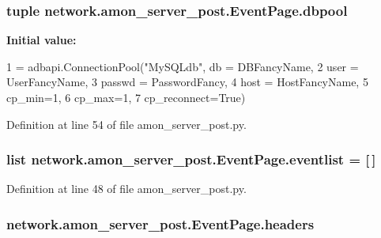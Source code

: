 \hypertarget{classnetwork_1_1amon__server__post_1_1_event_page_a27945808b5c4a8cdcde134a10df4965d}{
\subsubsection[{dbpool}]{\setlength{\rightskip}{0pt plus 5cm}tuple network.\-amon\-\_\-server\-\_\-post.\-Event\-Page.\-dbpool\hspace{0.3cm}{\ttfamily [static]}}}\label{classnetwork_1_1amon__server__post_1_1_event_page_a27945808b5c4a8cdcde134a10df4965d}
{\bfseries Initial value\-:}
\begin{DoxyCode}
1 = adbapi.ConnectionPool(\textcolor{stringliteral}{"MySQLdb"}, db = DBFancyName, 
2                                             user = UserFancyName, 
3                                             passwd = PasswordFancy, 
4                                             host = HostFancyName,
5                                             cp\_min=1,
6                                             cp\_max=1,
7                                             cp\_reconnect=\textcolor{keyword}{True})
\end{DoxyCode}


Definition at line 54 of file amon\-\_\-server\-\_\-post.\-py.

\hypertarget{classnetwork_1_1amon__server__post_1_1_event_page_a758c79966f818aa356316d87052f9c2e}{
\subsubsection[{eventlist}]{\setlength{\rightskip}{0pt plus 5cm}list network.\-amon\-\_\-server\-\_\-post.\-Event\-Page.\-eventlist = \mbox{[}$\,$\mbox{]}\hspace{0.3cm}{\ttfamily [static]}}}\label{classnetwork_1_1amon__server__post_1_1_event_page_a758c79966f818aa356316d87052f9c2e}


Definition at line 48 of file amon\-\_\-server\-\_\-post.\-py.

\hypertarget{classnetwork_1_1amon__server__post_1_1_event_page_a032c0165742082f9d0e347cbdfb50711}{
\subsubsection[{headers}]{\setlength{\rightskip}{0pt plus 5cm}network.\-amon\-\_\-server\-\_\-post.\-Event\-Page.\-headers}}\label{classnetwork_1_1amon__server__post_1_1_event_page_a032c0165742082f9d0e347cbdfb50711}


